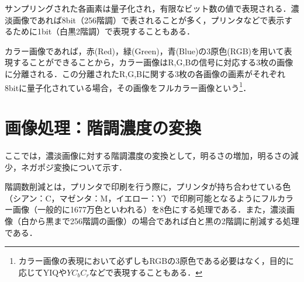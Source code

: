 サンプリングされた各画素は量子化され，有限なビット数の値で表現される．濃淡画像であれば8bit（256階調）で表されることが多く，プリンタなどで表示するために1bit（白黒2階調）で表現することもある．

カラー画像であれば，赤(Red)，緑(Green)，青(Blue)の3原色(RGB)を用いて表現することができることから，カラー画像はR,G,Bの信号に対応する3枚の画像に分離される．この分離されたR,G,Bに関する3枚の各画像の画素がそれぞれ8bitに量子化されている場合，その画像をフルカラー画像という\footnote{カラー画像の表現において必ずしもRGBの3原色である必要はなく，目的に応じてYIQや$YC_bC_r$などで表現することもある．}．

\section{画像処理：階調濃度の変換}

ここでは，濃淡画像に対する階調濃度の変換として，明るさの増加，明るさの減少，ネガポジ変換について示す．

階調数削減とは，プリンタで印刷を行う際に，プリンタが持ち合わせている色（シアン：C，マゼンタ：M，イエロー：Y）で印刷可能となるようにフルカラー画像（一般的に1677万色といわれる）を8色にする処理である．また，濃淡画像（白から黒まで256階調の画像）の場合であれば白と黒の2階調に削減する処理である．


